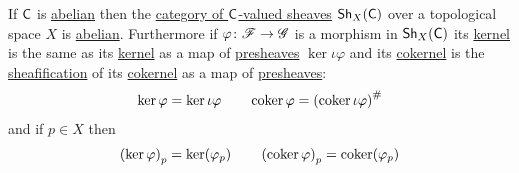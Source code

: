 \documentclass[../../main]{subfiles}
\begin{document}
\begin{theorem}\label{thm:sheaf-category-is-abelian}
  If \(\mathsf{C}\) is \hyperref[def:abelian-category]{abelian} then the \hyperref[def:sheaf]{category of \(\mathsf{C}\)-valued sheaves} \(\mathsf{Sh}_{X}(\mathsf{C})\) over a topological space \(X\) is \hyperref[def:abelian-category]{abelian}.
  Furthermore if \(\varphi\colon \mathscr{F} \to \mathscr{G}\) is a morphism in \(\mathsf{Sh}_{X}(\mathsf{C})\) its \hyperref[def:categorical-kernel]{kernel} is the same as its \hyperref[def:categorical-kernel]{kernel} as a map of \hyperref[def:presheaf]{presheaves} \(\ker \iota\varphi\) and its \hyperref[def:categorical-cokernel]{cokernel} is the \hyperref[def:sheafification]{sheafification} of its \hyperref[def:categorical-cokernel]{cokernel} as a map of \hyperref[def:presheaf]{presheaves}:
  \begin{align*}
    \ker \varphi = \ker \iota\varphi \qquad \operatorname*{coker} \varphi = \left( \operatorname*{coker} \iota\varphi \right)^{\#}
  \end{align*}
  and if \(p \in X\) then
  \begin{equation*}
    \left( \ker \varphi \right)_{p} = \ker (\varphi_{p}) \qquad \left( \operatorname*{coker} \varphi \right)_{p} = \operatorname*{coker} (\varphi_{p})
  \end{equation*}
\end{theorem}
\end{document}
